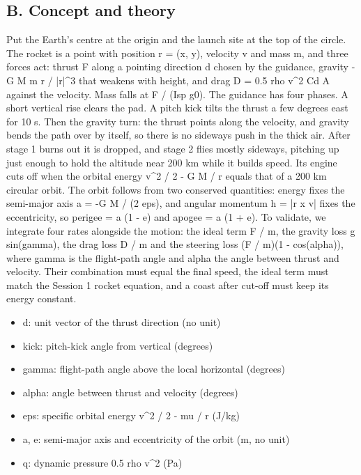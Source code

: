 \documentclass[11pt,a4paper]{article}
\begin{document}
\subsection*{B. Concept and theory}
Put the Earth's centre at the origin and the launch site at the top of the circle. The rocket is a point with position r = (x, y), velocity v and mass m, and three forces act: thrust F along a pointing direction d chosen by the guidance, gravity -G M m r / |r|\textasciicircum{}3 that weakens with height, and drag D = 0.5 rho v\textasciicircum{}2 Cd A against the velocity. Mass falls at F / (Isp g0). The guidance has four phases. A short vertical rise clears the pad. A pitch kick tilts the thrust a few degrees east for 10 s. Then the gravity turn: the thrust points along the velocity, and gravity bends the path over by itself, so there is no sideways push in the thick air. After stage 1 burns out it is dropped, and stage 2 flies mostly sideways, pitching up just enough to hold the altitude near 200 km while it builds speed. Its engine cuts off when the orbital energy v\textasciicircum{}2 / 2 - G M / r equals that of a 200 km circular orbit. The orbit follows from two conserved quantities: energy fixes the semi-major axis a = -G M / (2 eps), and angular momentum h = |r x v| fixes the eccentricity, so perigee = a (1 - e) and apogee = a (1 + e). To validate, we integrate four rates alongside the motion: the ideal term F / m, the gravity loss g sin(gamma), the drag loss D / m and the steering loss (F / m)(1 - cos(alpha)), where gamma is the flight-path angle and alpha the angle between thrust and velocity. Their combination must equal the final speed, the ideal term must match the Session 1 rocket equation, and a coast after cut-off must keep its energy constant.

\begin{itemize}[nosep]
\item d: unit vector of the thrust direction (no unit)
\item kick: pitch-kick angle from vertical (degrees)
\item gamma: flight-path angle above the local horizontal (degrees)
\item alpha: angle between thrust and velocity (degrees)
\item eps: specific orbital energy v\textasciicircum{}2 / 2 - mu / r (J/kg)
\item a, e: semi-major axis and eccentricity of the orbit (m, no unit)
\item q: dynamic pressure 0.5 rho v\textasciicircum{}2 (Pa)
\end{itemize}
\end{document}
